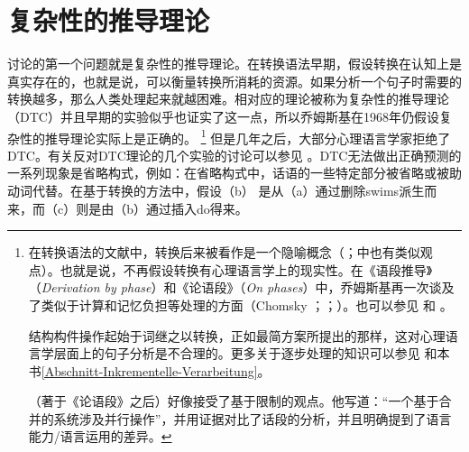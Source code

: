 \section{复杂性的推导理论}
\label{sec-dtc}

 \citet{SW2011a}讨论的第一个问题就是复杂性的推导理论。在转换语法早期，假设转换在认知上是真实存在的，也就是说，可以衡量转换所消耗的资源。如果分析一个句子时需要的转换越多，那么人类处理起来就越困难。相对应的理论被称为复杂性的推导理论（DTC）并且早期的实验似乎也证实了这一点\citep{MMK64a,SP65a,CO66a}，所以乔姆斯基在1968年仍假设复杂性的推导理论实际上是正确的\citep[--250]{Chomsky76b-u}。 \footnote{%
在转换语法的文献中，转换后来被看作是一个隐喻概念（\citealp[]{Lohnstein2014a}；\citealp[Footnote~4]{Chomsky2001a-u}中也有类似观点）。也就是说，不再假设转换有心理语言学上的现实性。在《语段推导》（\emph{Derivation by phase}）和《论语段》（\emph{On phases}）中，乔姆斯基再一次谈及了类似于计算和记忆负担等处理的方面（Chomsky \citeyear[, 12,15]{Chomsky2001a-u}；\citeyear[, 12]{Chomsky2007a}；\citeyear[, 145, 146, 155]{Chomsky2008a}）。也可以参见 和 。

结构构件操作起始于词继之以转换，正如最简方案所提出的那样，这对心理语言学层面上的句子分析是不合理的。更多关于逐步处理的知识可以参见 和本书\ref{Abschnitt-Inkrementelle-Verarbeitung}。

 \citet[]{Chomsky2007a}（著于《论语段》之后）好像接受了基于限制的观点。他写道：“一个基于合并的系统涉及并行操作”，并用证据对比了话段的分析，并且明确提到了语言能力/语言运用的差异。 %
} 但是几年之后，大部分心理语言学家拒绝了DTC。有关反对DTC理论的几个实验的讨论可以参见 。DTC无法做出正确预测的一系列现象是省略构式，例如\citep*[]{FBG74a-u}：在省略构式中，话语的一些特定部分被省略或被助动词代替。在基于转换的方法中，假设（b） 是从（a）通过删除swims派生而来，而（c）则是由（b）通过插入do得来。
